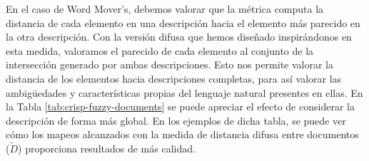 En el caso de Word Mover's, debemos valorar que la métrica computa la distancia de cada elemento en una descripción hacia el elemento más parecido en la otra descripción. Con la versión difusa que hemos diseñado inspirándonos en esta medida, valoramos el parecido de cada elemento al conjunto de la intersección generado por ambas descripciones. Esto nos permite valorar la distancia de los elementos hacia descripciones completas, para así valorar las ambigüedades y características propias del lenguaje natural presentes en ellas. En la Tabla \ref{tab:crisp-fuzzy-documents} se puede apreciar el efecto de considerar la descripción de forma más global. En los ejemplos de dicha tabla, se puede ver cómo los mapeos alcanzados con la medida de distancia difusa entre documentos ($\tilde{D}$) proporciona resultados de más calidad.








